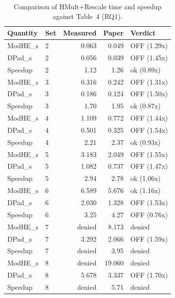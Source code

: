 
\begin{table}[htbp]
  \centering
  \caption{Comparison of HMult+Rescale time and speedup against Table~4 (RQ1).}
  \label{tab:compare-table4}
  \begin{tabular}{l l r r l}
    \toprule
    Quantity & Set & Measured & Paper & Verdict \\
    \midrule
    ModHE\_s & 2 & 0.063 & 0.049 & OFF (1.29x) \\
    DPad\_s & 2 & 0.056 & 0.039 & OFF (1.45x) \\
    Speedup & 2 & 1.12 & 1.26 & ok (0.89x) \\
    ModHE\_s & 3 & 0.316 & 0.242 & OFF (1.31x) \\
    DPad\_s & 3 & 0.186 & 0.124 & OFF (1.50x) \\
    Speedup & 3 & 1.70 & 1.95 & ok (0.87x) \\
    ModHE\_s & 4 & 1.109 & 0.772 & OFF (1.44x) \\
    DPad\_s & 4 & 0.501 & 0.325 & OFF (1.54x) \\
    Speedup & 4 & 2.21 & 2.37 & ok (0.93x) \\
    ModHE\_s & 5 & 3.183 & 2.049 & OFF (1.55x) \\
    DPad\_s & 5 & 1.082 & 0.737 & OFF (1.47x) \\
    Speedup & 5 & 2.94 & 2.78 & ok (1.06x) \\
    ModHE\_s & 6 & 6.589 & 5.676 & ok (1.16x) \\
    DPad\_s & 6 & 2.030 & 1.328 & OFF (1.53x) \\
    Speedup & 6 & 3.25 & 4.27 & OFF (0.76x) \\
    ModHE\_s & 7 & denied & 8.173 & denied \\
    DPad\_s & 7 & 3.292 & 2.066 & OFF (1.59x) \\
    Speedup & 7 & denied & 3.95 & denied \\
    ModHE\_s & 8 & denied & 19.060 & denied \\
    DPad\_s & 8 & 5.678 & 3.337 & OFF (1.70x) \\
    Speedup & 8 & denied & 5.71 & denied \\
    \bottomrule
  \end{tabular}
\end{table}

